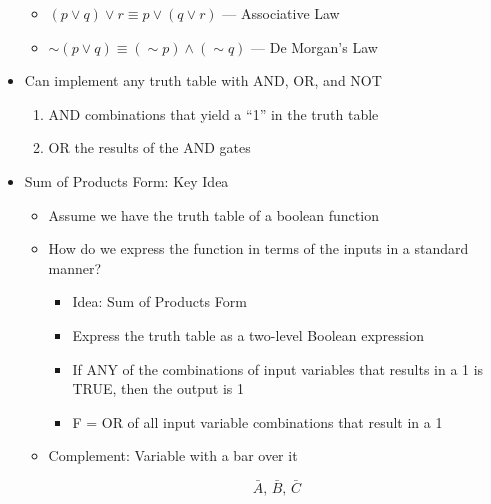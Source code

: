 \begin{itemize}
\begin{itemize}
      \item $(p \vee q )\vee r \equiv p\vee (q\vee r)$ — Associative Law

      \item $\sim (p\vee q) \equiv (\sim p)\wedge (\sim q)$ — De Morgan's Law

    \end{itemize}

  \item Can implement any truth table with AND, OR, and NOT

    \begin{enumerate}

      \item AND combinations that yield a ``1'' in the truth table

      \item OR the results of the AND gates

    \end{enumerate}

  \item Sum of Products Form: Key Idea

    \begin{itemize}

      \item Assume we have the truth table of a boolean function

      \item How do we express the function in terms of the inputs in a standard manner?

        \begin{itemize}

          \item Idea: Sum of Products Form

          \item Express the truth table as a two-level Boolean expression

          \item If ANY of the combinations of input variables that results in a 1 is TRUE, then the output is 1

          \item F = OR of all input variable combinations that result in a 1

        \end{itemize}

      \item Complement: Variable with a bar over it

        $$\bar{A},\,\bar{B},\,\bar{C}$$


\end{itemize}
\end{itemize}
